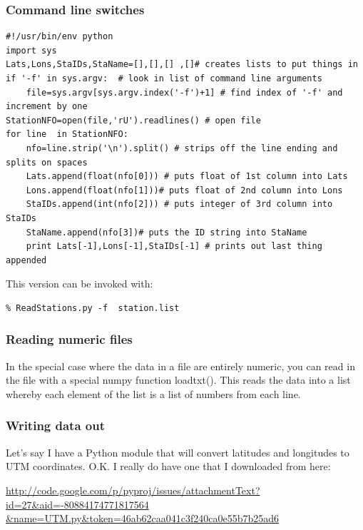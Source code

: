 \documentclass[11pt]{book}
\begin{document}
{{{\subsubsection{Command line switches}

{ \color{blue} \begin{verbatim}
#!/usr/bin/env python
import sys
Lats,Lons,StaIDs,StaName=[],[],[] ,[]# creates lists to put things in
if '-f' in sys.argv:  # look in list of command line arguments
    file=sys.argv[sys.argv.index('-f')+1] # find index of '-f' and increment by one
StationNFO=open(file,'rU').readlines() # open file
for line  in StationNFO:
    nfo=line.strip('\n').split() # strips off the line ending and splits on spaces
    Lats.append(float(nfo[0])) # puts float of 1st column into Lats
    Lons.append(float(nfo[1]))# puts float of 2nd column into Lons
    StaIDs.append(int(nfo[2])) # puts integer of 3rd column into StaIDs
    StaName.append(nfo[3])# puts the ID string into StaName
    print Lats[-1],Lons[-1],StaIDs[-1] # prints out last thing appended
\end{verbatim}}

\noindent This version can be invoked with:

{\color{blue}\begin{verbatim}
% ReadStations.py -f  station.list
\end{verbatim}}

\subsubsection{Reading numeric files}

In the special case where the data in a file are entirely numeric, you can read in the file with a special {\color{blue}numpy} function {\color{blue}loadtxt()}.  This reads the data into a list whereby each element of the list is a list of numbers from each line.
 
 \subsubsection{Writing data out}

Let's say I have a Python module that will convert latitudes and longitudes to UTM coordinates.  O.K. I really do have one that I downloaded from here:  

\url{http://code.google.com/p/pyproj/issues/attachmentText?id=27\&aid=-80884174771817564 \&name=UTM.py\&token=46ab62caa041c3f240ca0e55b7b25ad6}

}}}
\end{document}
